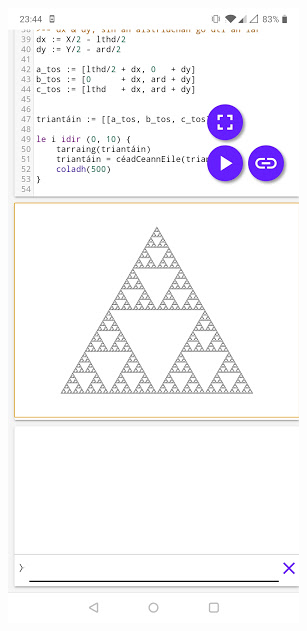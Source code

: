 \begin{minipage}[t]{0.45\textwidth}
    \begin{center}
        \includegraphics[scale=0.48]{app4assets/sierpinski-mobile}
        \label{screenshot:sierpinski-mobile}
    \end{center}
\end{minipage}

